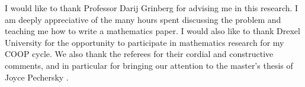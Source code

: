 \documentclass[final,nomarks]{dmtcs-episciences}
\theoremstyle{definition}
\theoremstyle{definition}
\theoremstyle{remark}
\begin{document}
\acknowledgments
I would like to thank Professor Darij Grinberg for advising me in this research. I am deeply appreciative of the many hours spent discussing the problem and teaching me how to write a mathematics paper. I would also like to thank Drexel University for the opportunity to participate in mathematics research for my COOP cycle. We also thank the referees for their cordial and constructive comments, and in particular for bringing our attention to the master's thesis of Joyce Pechersky \cite{Pe2023}.




 
\end{document}

